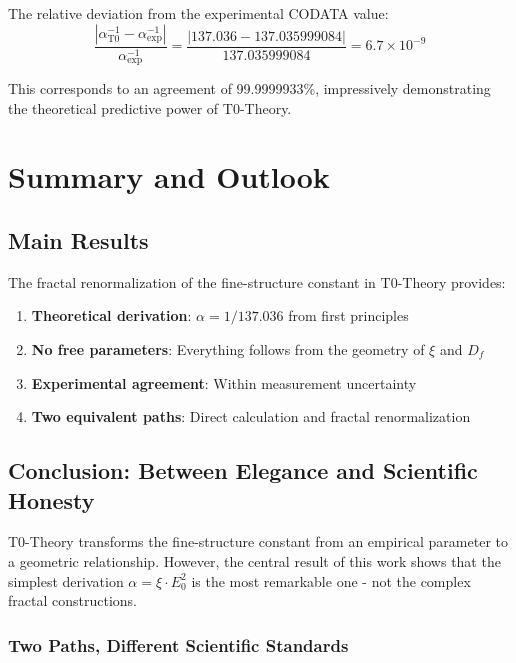 \documentclass[12pt,a4paper]{article}
\theoremstyle{definition}
\begin{document}
	The relative deviation from the experimental CODATA value:
	\begin{equation}
		\frac{|\alpha^{-1}_{\text{T0}} - \alpha^{-1}_{\text{exp}}|}{\alpha^{-1}_{\text{exp}}} = \frac{|137.036 - 137.035999084|}{137.035999084} = 6.7 \times 10^{-9}
	\end{equation}
	
	This corresponds to an agreement of 99.9999933\%, impressively demonstrating the theoretical predictive power of T0-Theory.
	
	\section{Summary and Outlook}
	
	\subsection{Main Results}
	
	The fractal renormalization of the fine-structure constant in T0-Theory provides:
	
	\begin{enumerate}
		\item \textbf{Theoretical derivation}: $\alpha = 1/137.036$ from first principles
		\item \textbf{No free parameters}: Everything follows from the geometry of $\xi$ and $D_f$
		\item \textbf{Experimental agreement}: Within measurement uncertainty
		\item \textbf{Two equivalent paths}: Direct calculation and fractal renormalization
	\end{enumerate}
	
	\subsection{Conclusion: Between Elegance and Scientific Honesty}
	
	T0-Theory transforms the fine-structure constant from an empirical parameter to a geometric relationship. However, the central result of this work shows that the simplest derivation $\alpha = \xi \cdot E_0^2$ is the most remarkable one - not the complex fractal constructions.
	
	\subsubsection{Two Paths, Different Scientific Standards}
	
\end{document}
